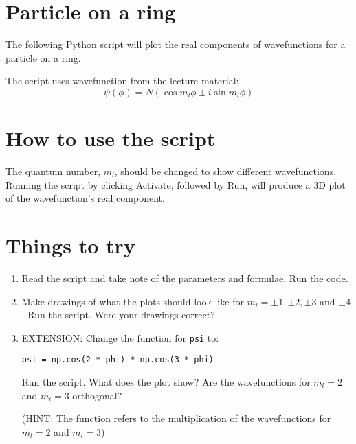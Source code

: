 \documentclass{article}
\begin{document}
\section{Particle on a ring}

The following Python script will plot the real components of wavefunctions for a particle on a ring. \par\medskip 
\noindent The script uses wavefunction from the lecture material:
\[\psi (\phi) = N(\cos m_l \phi \pm i \sin m_l \phi) \]

\section{How to use the script}
The quantum number, $m_l$, should be changed to show different wavefunctions. Running the script by clicking Activate, followed by Run, will produce a 3D plot of the wavefunction's real component.

\section{Things to try}
\begin{enumerate}
\item Read the script and take note of the parameters and formulae. Run the code.
\item Make drawings of what the plots should look like for $m_l=\pm 1, \pm 2, \pm 3$ and $\pm 4$. Run the script. Were your drawings correct? 
\item EXTENSION: Change the function for \texttt{psi} to: \par\texttt{psi = np.cos(2 * phi) * np.cos(3 * phi)}\par Run the script. What does the plot show? Are the wavefunctions for $m_l = 2$ and $m_l = 3$ orthogonal? 

(HINT: The function refers to the multiplication of the wavefunctions for $m_l = 2$ and $m_l = 3$)
\end{enumerate}
\end{document}
